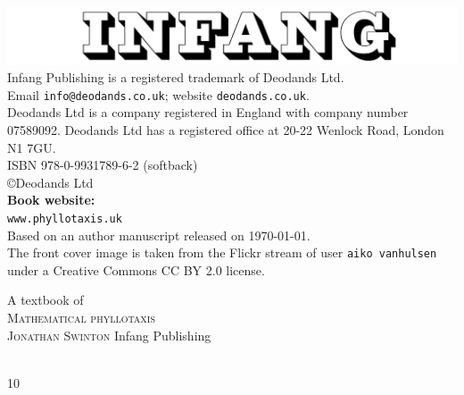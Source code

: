 { %



\thispagestyle{titlingpage}
{
\mbox{}\vspace{\fill}
		\centering	
		\includegraphics[width=.6\jfigwidth]{./Figures/infang.jpg}
		\\[10ex]
		Infang Publishing is a registered trademark of Deodands Ltd.
		\\
		Email \texttt{info@deodands.co.uk}; website \texttt{deodands.co.uk}.
	\\[5ex]
		Deodands Ltd is a company registered in England with company number 07589092. 
		Deodands Ltd has a registered office at
		20-22 Wenlock Road, London N1 7GU.
		\\[10ex] %
		{\textsc{ISBN}} 978-0-9931789-6-2 (softback)
		\\[10ex]
		\copyright Deodands Ltd \jPublicationYear
		\\[20ex]
		\textbf{Book website:}
		\\
		\texttt{www.phyllotaxis.uk}
		\\[10ex]
		{Based on an author manuscript  \jdraftnumber{} released on \today.}
		\\[10ex]
The front cover image is taken from the Flickr stream of user \texttt{aiko vanhulsen} under a Creative Commons CC BY 2.0 license.\\
}
\newpage

\thispagestyle{titlingpage}
{
	\centering
	{\Huge A textbook of }
	\\[3ex]
	{\HUGE\jEmphasisColour	\textsc{Mathematical phyllotaxis}}\\
	\vfill
	{\Huge	\scshape Jonathan Swinton}
	\vfill
	{\Large	Infang Publishing}
	\\[3ex]
	{\Large \textsc{\jPublicationYear}
		\\}
}
\newpage

10}
